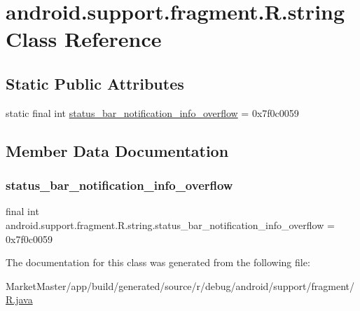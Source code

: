 \hypertarget{classandroid_1_1support_1_1fragment_1_1R_1_1string}{}\section{android.\+support.\+fragment.\+R.\+string Class Reference}
\label{classandroid_1_1support_1_1fragment_1_1R_1_1string}
\subsection*{Static Public Attributes}
\begin{DoxyCompactItemize}
\item 
static final int \mbox{\hyperlink{classandroid_1_1support_1_1fragment_1_1R_1_1string_afe54f0256b7cd91c2b0175f6dd55f9cc}{status\+\_\+bar\+\_\+notification\+\_\+info\+\_\+overflow}} = 0x7f0c0059
\end{DoxyCompactItemize}


\subsection{Member Data Documentation}
\mbox{\label{classandroid_1_1support_1_1fragment_1_1R_1_1string_afe54f0256b7cd91c2b0175f6dd55f9cc}} 
\subsubsection{\texorpdfstring{status\+\_\+bar\+\_\+notification\+\_\+info\+\_\+overflow}{status\_bar\_notification\_info\_overflow}}
{\footnotesize\ttfamily final int android.\+support.\+fragment.\+R.\+string.\+status\+\_\+bar\+\_\+notification\+\_\+info\+\_\+overflow = 0x7f0c0059\hspace{0.3cm}{\ttfamily [static]}}



The documentation for this class was generated from the following file\+:\begin{DoxyCompactItemize}
\item 
Market\+Master/app/build/generated/source/r/debug/android/support/fragment/\mbox{\hyperlink{debug_2android_2support_2fragment_2R_8java}{R.\+java}}\end{DoxyCompactItemize}
